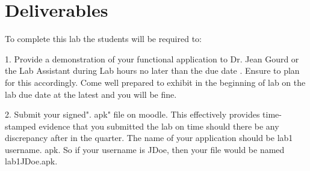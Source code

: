 \section{Deliverables}
\begin{flushleft}
To complete this lab the students will be required to:


1. Provide a demonstration of your functional application to Dr. Jean Gourd or the Lab Assistant during Lab hours no later than the due date . Ensure to plan for this accordingly. Come well prepared to exhibit in the beginning of lab on the lab due date at the latest and you will be fine. 

2. Submit your signed". apk" file on moodle. This effectively provides time-stamped evidence that you submitted the lab on time should there be any 	   discrepancy after in the quarter. The name of your application should be lab1 username. apk. So if your username is JDoe, then your file would be named lab1JDoe.apk.
\end{flushleft}
